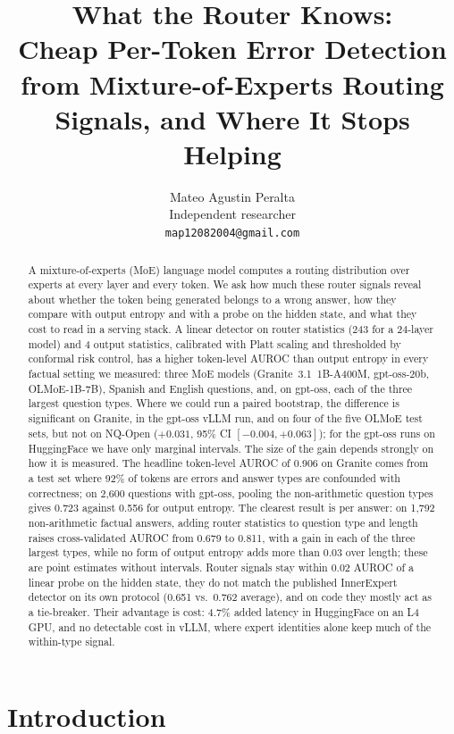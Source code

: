 \documentclass[11pt]{article}
\title{What the Router Knows:\\Cheap Per-Token Error Detection from Mixture-of-Experts Routing Signals, and Where It Stops Helping}
\author{Mateo Agustin Peralta\\ {Independent researcher}\\ \texttt{map12082004@gmail.com}}
\date{}
\begin{document}
\maketitle

\begin{abstract}
A mixture-of-experts (MoE) language model computes a routing distribution over experts at every layer and every token.
We ask how much these router signals reveal about whether the token being generated belongs to a wrong answer, how they compare with output entropy and with a probe on the hidden state, and what they cost to read in a serving stack.
A linear detector on router statistics (243 for a 24-layer model) and 4 output statistics, calibrated with Platt scaling and thresholded by conformal risk control, has a higher token-level AUROC than output entropy in every factual setting we measured: three MoE models (Granite~3.1~1B-A400M, gpt-oss-20b, OLMoE-1B-7B), Spanish and English questions, and, on gpt-oss, each of the three largest question types.
Where we could run a paired bootstrap, the difference is significant on Granite, in the gpt-oss vLLM run, and on four of the five OLMoE test sets, but not on NQ-Open ($+0.031$, 95\% CI $[-0.004, +0.063]$); for the gpt-oss runs on HuggingFace we have only marginal intervals.
The size of the gain depends strongly on how it is measured.
The headline token-level AUROC of 0.906 on Granite comes from a test set where 92\% of tokens are errors and answer types are confounded with correctness; on 2,600 questions with gpt-oss, pooling the non-arithmetic question types gives 0.723 against 0.556 for output entropy.
The clearest result is per answer: on 1,792 non-arithmetic factual answers, adding router statistics to question type and length raises cross-validated AUROC from 0.679 to 0.811, with a gain in each of the three largest types, while no form of output entropy adds more than 0.03 over length; these are point estimates without intervals.
Router signals stay within 0.02 AUROC of a linear probe on the hidden state, they do not match the published InnerExpert detector on its own protocol (0.651 vs.\ 0.762 average), and on code they mostly act as a tie-breaker.
Their advantage is cost: 4.7\% added latency in HuggingFace on an L4 GPU, and no detectable cost in vLLM, where expert identities alone keep much of the within-type signal.
\end{abstract}

\section{Introduction}
\end{document}
